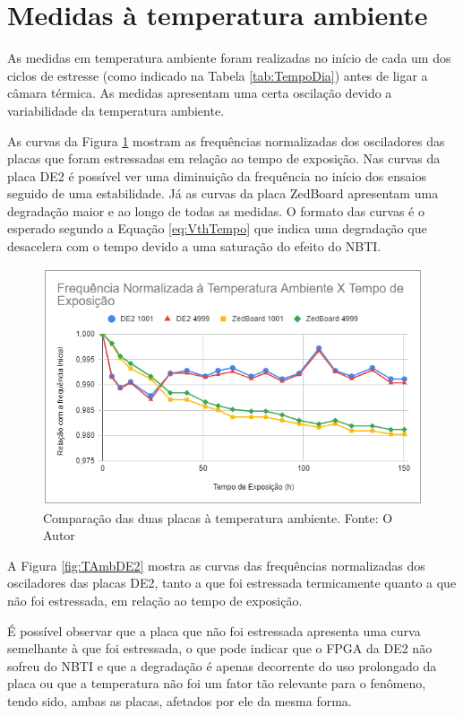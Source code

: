 \section{Medidas à temperatura ambiente}
\label{sec:ResTAmb}

As medidas em temperatura ambiente foram realizadas no início de cada um dos ciclos de estresse (como indicado na Tabela \ref{tab:TempoDia}) antes de ligar a câmara térmica. As medidas apresentam uma certa oscilação devido a variabilidade da temperatura ambiente.

As curvas da Figura \ref{fig:TAmbEstressadas} mostram as frequências normalizadas dos osciladores das placas que foram estressadas em relação ao tempo de exposição. Nas curvas da placa DE2 é possível ver uma diminuição da frequência no início dos ensaios seguido de uma estabilidade. Já as curvas da placa ZedBoard apresentam uma degradação maior e ao longo de todas as medidas. O formato das curvas é o esperado segundo a Equação \ref{eq:VthTempo} que indica uma degradação que desacelera com o tempo devido a uma saturação do efeito do NBTI.

\begin{figure}[H]
    \centering
    \includegraphics[scale=0.75]{figures/Resultados/TAmbEstressadas}
    \caption{Comparação das duas placas à temperatura ambiente. Fonte: O Autor}
    \label{fig:TAmbEstressadas}
\end{figure}

A Figura \ref{fig:TAmbDE2} mostra as curvas das frequências normalizadas dos osciladores das placas  DE2, tanto a que foi estressada termicamente quanto a que não foi estressada, em relação ao tempo de exposição.

É possível observar que a placa que não foi estressada apresenta uma curva semelhante à que foi estressada, o que pode indicar que o FPGA da DE2 não sofreu do NBTI e que a degradação é apenas decorrente do uso prolongado da placa ou que a temperatura não foi um fator tão relevante para o fenômeno, tendo sido, ambas as placas, afetados por ele da mesma forma.

